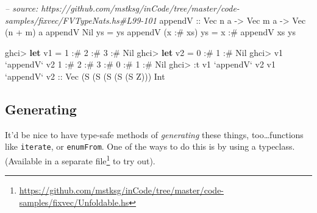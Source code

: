 \documentclass[]{article}
\newenvironment{Shaded}{\begin{snugshade}}{\end{snugshade}}
\newcommand{\CommentTok}[1]{\textcolor[rgb]{0.56,0.35,0.01}{\textit{#1}}}
\newcommand{\DataTypeTok}[1]{\textcolor[rgb]{0.13,0.29,0.53}{#1}}
\newcommand{\DecValTok}[1]{\textcolor[rgb]{0.00,0.00,0.81}{#1}}
\newcommand{\FunctionTok}[1]{\textcolor[rgb]{0.00,0.00,0.00}{#1}}
\newcommand{\KeywordTok}[1]{\textcolor[rgb]{0.13,0.29,0.53}{\textbf{#1}}}
\newcommand{\NormalTok}[1]{#1}
\newcommand{\OtherTok}[1]{\textcolor[rgb]{0.56,0.35,0.01}{#1}}
\renewcommand{\href}[2]{#2\footnote{\url{#1}}}
\begin{document}
\begin{Shaded}
\begin{Highlighting}[]
\CommentTok{-- source: https://github.com/mstksg/inCode/tree/master/code-samples/fixvec/FVTypeNats.hs#L99-101}
\OtherTok{appendV ::} \DataTypeTok{Vec}\NormalTok{ n a }\OtherTok{->} \DataTypeTok{Vec}\NormalTok{ m a }\OtherTok{->} \DataTypeTok{Vec}\NormalTok{ (n }\FunctionTok{+}\NormalTok{ m) a}
\NormalTok{appendV }\DataTypeTok{Nil}\NormalTok{       ys }\FunctionTok{=}\NormalTok{ ys}
\NormalTok{appendV (x }\FunctionTok{:#}\NormalTok{ xs) ys }\FunctionTok{=}\NormalTok{ x }\FunctionTok{:#}\NormalTok{ appendV xs ys}
\end{Highlighting}
\end{Shaded}

\begin{Shaded}
\begin{Highlighting}[]
\NormalTok{ghci}\FunctionTok{>} \KeywordTok{let}\NormalTok{ v1 }\FunctionTok{=} \DecValTok{1} \FunctionTok{:#} \DecValTok{2} \FunctionTok{:#} \DecValTok{3} \FunctionTok{:#} \DataTypeTok{Nil}
\NormalTok{ghci}\FunctionTok{>} \KeywordTok{let}\NormalTok{ v2 }\FunctionTok{=} \DecValTok{0} \FunctionTok{:#} \DecValTok{1} \FunctionTok{:#} \DataTypeTok{Nil}
\NormalTok{ghci}\FunctionTok{>}\NormalTok{ v1 }\OtherTok{`appendV`}\NormalTok{ v2}
\DecValTok{1} \FunctionTok{:#} \DecValTok{2} \FunctionTok{:#} \DecValTok{3} \FunctionTok{:#} \DecValTok{0} \FunctionTok{:#} \DecValTok{1} \FunctionTok{:#} \DataTypeTok{Nil}
\NormalTok{ghci}\FunctionTok{>} \FunctionTok{:}\NormalTok{t v1 }\OtherTok{`appendV`}\NormalTok{ v2}
\NormalTok{v1 }\OtherTok{`appendV` v2 ::} \DataTypeTok{Vec}\NormalTok{ (}\DataTypeTok{S}\NormalTok{ (}\DataTypeTok{S}\NormalTok{ (}\DataTypeTok{S}\NormalTok{ (}\DataTypeTok{S}\NormalTok{ (}\DataTypeTok{S} \DataTypeTok{Z}\NormalTok{))) }\DataTypeTok{Int}
\end{Highlighting}
\end{Shaded}

\hypertarget{generating}{%
\subsection{Generating}\label{generating}}

It'd be nice to have type-safe methods of \emph{generating} these things,
too\ldots{}functions like \texttt{iterate}, or \texttt{enumFrom}. One of the
ways to do this is by using a typeclass. (Available in a
\href{https://github.com/mstksg/inCode/tree/master/code-samples/fixvec/Unfoldable.hs}{separate
file} to try out).
\end{document}
